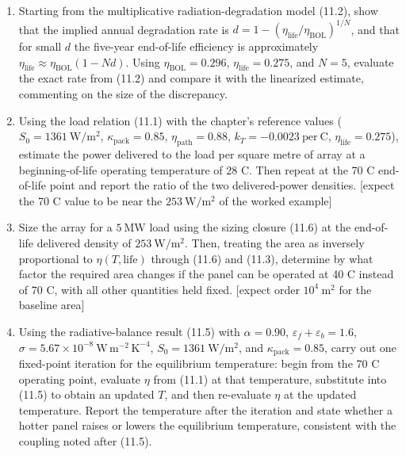 \documentclass[
  11pt,
  openany,
  oneside]{book}
\begin{document}
\begin{enumerate}
\def\labelenumi{\arabic{enumi}.}
\item
  Starting from the multiplicative radiation-degradation model (11.2),
  show that the implied annual degradation rate is
  \(d = 1 - (\eta_{\mathrm{life}}/\eta_{\mathrm{BOL}})^{1/N}\), and that
  for small \(d\) the five-year end-of-life efficiency is approximately
  \(\eta_{\mathrm{life}} \approx \eta_{\mathrm{BOL}}(1 - Nd)\). Using
  \(\eta_{\mathrm{BOL}} = 0.296\), \(\eta_{\mathrm{life}} = 0.275\), and
  \(N = 5\), evaluate the exact rate from (11.2) and compare it with the
  linearized estimate, commenting on the size of the discrepancy.
\item
  Using the load relation (11.1) with the chapter's reference values
  (\(S_0 = 1361\ \mathrm{W/m^2}\), \(\kappa_{\mathrm{pack}} = 0.85\),
  \(\eta_{\mathrm{path}} = 0.88\), \(k_T = -0.0023\ \mathrm{per\ C}\),
  \(\eta_{\mathrm{life}} = 0.275\)), estimate the power delivered to the
  load per square metre of array at a beginning-of-life operating
  temperature of 28 C. Then repeat at the 70 C end-of-life point and
  report the ratio of the two delivered-power densities. {[}expect the
  70 C value to be near the \(253\ \mathrm{W/m^2}\) of the worked
  example{]}
\item
  Size the array for a \(5\ \mathrm{MW}\) load using the sizing closure
  (11.6) at the end-of-life delivered density of
  \(253\ \mathrm{W/m^2}\). Then, treating the area as inversely
  proportional to \(\eta(T,\mathrm{life})\) through (11.6) and (11.3),
  determine by what factor the required area changes if the panel can be
  operated at 40 C instead of 70 C, with all other quantities held
  fixed. {[}expect order \(10^4\ \mathrm{m^2}\) for the baseline area{]}
\item
  Using the radiative-balance result (11.5) with \(\alpha = 0.90\),
  \(\varepsilon_f + \varepsilon_b = 1.6\),
  \(\sigma = 5.67\times 10^{-8}\ \mathrm{W\,m^{-2}\,K^{-4}}\),
  \(S_0 = 1361\ \mathrm{W/m^2}\), and \(\kappa_{\mathrm{pack}} = 0.85\),
  carry out one fixed-point iteration for the equilibrium temperature:
  begin from the 70 C operating point, evaluate \(\eta\) from (11.1) at
  that temperature, substitute into (11.5) to obtain an updated \(T\),
  and then re-evaluate \(\eta\) at the updated temperature. Report the
  temperature after the iteration and state whether a hotter panel
  raises or lowers the equilibrium temperature, consistent with the
  coupling noted after (11.5).
\end{enumerate}
\end{document}
